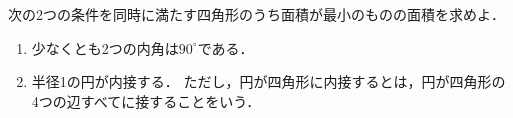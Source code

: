 \documentclass[../../main.tex]{subfiles}
\begin{document}
次の2つの条件を同時に満たす四角形のうち面積が最小のものの面積を求めよ．
\begin{enumerate}
  \item 少なくとも2つの内角は${90}^\circ$である．
  \item 半径1の円が内接する．
    ただし，円が四角形に内接するとは，円が四角形の4つの辺すべてに接することをいう．
\end{enumerate}
\end{document}
